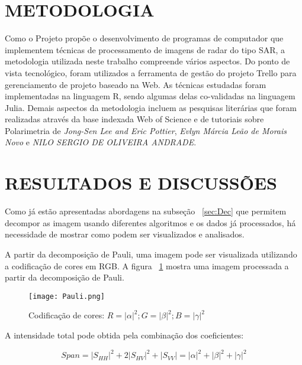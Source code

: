 \documentclass[a4paper,12pt]{article}
\begin{document}

\section{METODOLOGIA}
\label{sec:Met}

Como o Projeto propõe o desenvolvimento de programas de computador que implementem técnicas de processamento de imagens de radar do tipo SAR, a  metodologia utilizada neste trabalho compreende vários aspectos. Do ponto de vista tecnológico, foram utilizados a ferramenta de gestão do projeto Trello para gerenciamento de projeto baseado na Web. As técnicas estudadas foram implementadas na linguagem R, sendo algumas delas co-validadas na linguagem Julia.
Demais aspectos da metodologia incluem as pesquisas literárias que foram realizadas através da base indexada Web of Science e de tutoriais sobre Polarimetria de \emph{Jong-Sen Lee and Eric Pottier}, \emph{Evlyn Márcia Leão de Morais Novo} e \emph{NILO SERGIO DE OLIVEIRA ANDRADE}. 

\newpage
\section{RESULTADOS E DISCUSSÕES}
\label{sec:Result}

Como já estão apresentadas abordagens na subseção ~\ref{sec:Dec} que permitem decompor as imagem usando diferentes algoritmos e os dados já processados, há necessidade de mostrar como podem ser visualizados e analisados.

A partir da decomposição de Pauli, uma imagem pode ser visualizada utilizando a codificação de cores em RGB. A figura ~\ref{fig:Pauli} mostra uma imagem processada a partir da decomposição de Pauli.

\begin{figure}[H]
	\centering
	\texttt{[image: Pauli.png]}
	\caption{Codificação de cores: $R=|\alpha|^2; G=|\beta|^2; B=|\gamma|^2$}
	\label{fig:Pauli}
\end{figure}

A intensidade total pode obtida pela combinação dos coeficientes:

\begin{equation}
    Span = |S_{HH}|^2+2|S_{HV}|^2+|S_{VV}|=|\alpha|^2+|\beta|^2+|\gamma|^2
\end{equation}
\end{document}
